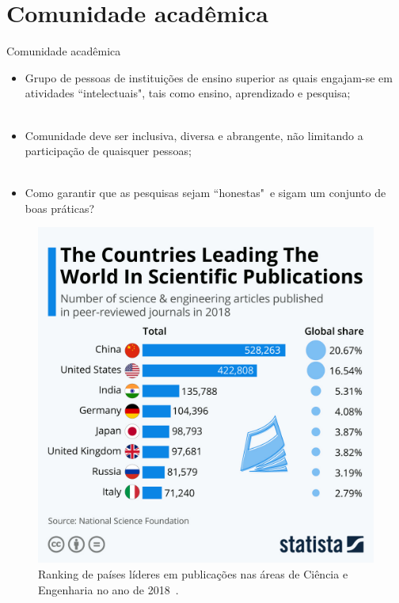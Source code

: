 \section{Comunidade acadêmica}
\label{s.community}

\begin{frame}{Comunidade acadêmica}
	\justify 
	\begin{itemize}
		\item<1> Grupo de pessoas de instituições de ensino superior as quais engajam-se em atividades ``intelectuais", tais como ensino, aprendizado e pesquisa;
		\\~\\
		\item<2> Comunidade deve ser inclusiva, diversa e abrangente, não limitando a participação de quaisquer pessoas;
		\\~\\
		\item<3> Como garantir que as pesquisas sejam ``honestas"~e sigam um conjunto de boas práticas?
	\end{itemize}
\end{frame}

\begin{frame}{}
	\centering
	\begin{figure}
		\includegraphics[scale=0.125]{figs/lead_country_papers.png}
		\caption{Ranking de países líderes em publicações nas áreas de Ciência e Engenharia no ano de 2018~\cite{Statista:18}.}
		\label{f.lead_country_papers}
	\end{figure}
\end{frame}

